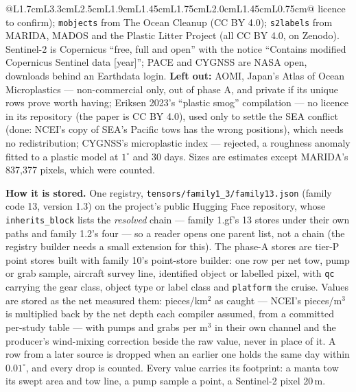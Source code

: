 \documentclass[10pt]{article}
\newcommand{\code}[1]{\texttt{#1}}
\begin{document}
{\begin{longtable}{@{}L{1.7cm}L{3.3cm}L{2.5cm}L{1.9cm}L{1.45cm}L{1.75cm}L{2.0cm}L{1.45cm}L{0.75cm}@{}}
{licence to confirm); \code{mobjects} from The Ocean Cleanup (CC BY 4.0); \code{s2labels} from MARIDA, MADOS and the
Plastic Litter Project (all CC BY 4.0, on Zenodo). Sentinel-2 is Copernicus ``free, full and open'' with the notice
``Contains modified Copernicus Sentinel data [year]''; PACE and CYGNSS are NASA open, downloads behind an Earthdata
login. \textbf{Left out:} AOMI, Japan's Atlas of Ocean Microplastics --- non-commercial only, out of phase A, and
private if its unique rows prove worth having; Eriksen 2023's ``plastic smog'' compilation --- no licence in its
repository (the paper is CC BY 4.0), used only to settle the SEA conflict (done: NCEI's copy of SEA's Pacific tows has the wrong positions), which needs no redistribution; CYGNSS's
microplastic index --- rejected, a roughness anomaly fitted to a plastic model at $1^\circ$ and 30 days. Sizes are
estimates except MARIDA's 837,377 pixels, which were counted.} \\
\end{longtable}}

\textbf{How it is stored.} One registry, \code{tensors/family1\_3/family13.json} (family code 13, version 1.3) on
the project's public Hugging Face repository, whose \code{inherits\_block} lists the \emph{resolved} chain ---
family 1.gf's 13 stores under their own paths and family 1.2's four --- so a reader opens one parent list, not a
chain (the registry builder needs a small extension for this). The phase-A stores are tier-P point stores built with
family 10's point-store builder: one row per net tow, pump or grab sample, aircraft survey line, identified object or
labelled pixel, with \code{qc} carrying the gear class, object type or label class and \code{platform} the cruise.
Values are stored as the net measured them: pieces/km$^2$ as caught --- NCEI's pieces/m$^3$ is multiplied back by
the net depth each compiler assumed, from a committed per-study table --- with pumps and grabs per m$^3$ in their
own channel and the producer's wind-mixing correction beside the raw value, never in place of it. A row from a later
source is dropped when an earlier one holds the same day within $0.01^\circ$, and every drop is counted. Every value
carries its footprint: a manta tow its swept area and tow line, a pump sample a point, a Sentinel-2 pixel 20\,m.
\end{document}
